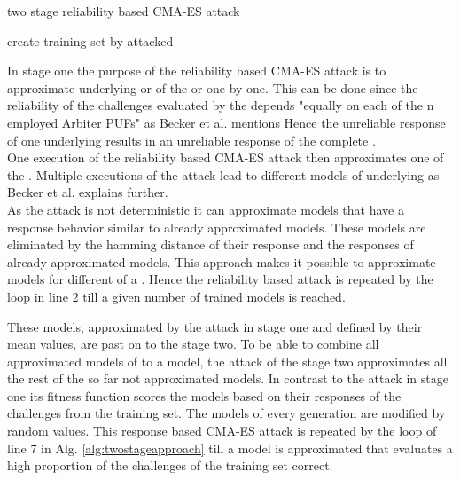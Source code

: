 \SetAlCapHSkip{0.2em}
\begin{algorithm}[H] %
\Indm
\SetAlgoLined
\caption{two stage reliability based \acl{CMA-ES} attack}
\label{alg:twostageapproach}
\Indp

create training set by attacked \xpuf\\

\end{algorithm}

In stage one the purpose of the reliability based \ac{CMA-ES} attack is to approximate underlying \apufs or \mpufs of the \xpuf or \mxpuf one by one.
This can be done since the reliability of the challenges evaluated by the \xpuf depends "equally on each of the n employed Arbiter PUFs" as Becker et al. mentions \cite{Becker2015ThePUFs}
Hence the unreliable response of one underlying \apuf results in an unreliable response of the complete \puf.\\
One execution of the reliability based \ac{CMA-ES} attack then approximates one of the \apufs.
Multiple executions of the attack lead to different models of underlying \apufs as Becker et al. explains further.\\
As the attack is not deterministic it can approximate models that have a response behavior similar to already approximated models.
These models are eliminated by the hamming distance of their response and the responses of already approximated models.
This approach makes it possible to approximate models for different \apufs of a \xpuf.
Hence the reliability based attack is repeated by the loop in line 2 till a given number of trained models is reached.

These models, approximated by the attack in stage one and defined by their mean values, are past on to the stage two.
To be able to combine all approximated models of \apuf to a \xpuf model, the attack of the stage two approximates all the rest of the so far not approximated models.
In contrast to the attack in stage one its fitness function scores the models based on their responses of the challenges from the training set.
The models of every generation are modified by random values.
This response based \ac{CMA-ES} attack is repeated by the loop of line 7 in Alg. \ref{alg:twostageapproach} till a model is approximated that evaluates a high proportion of the challenges of the training set correct.

